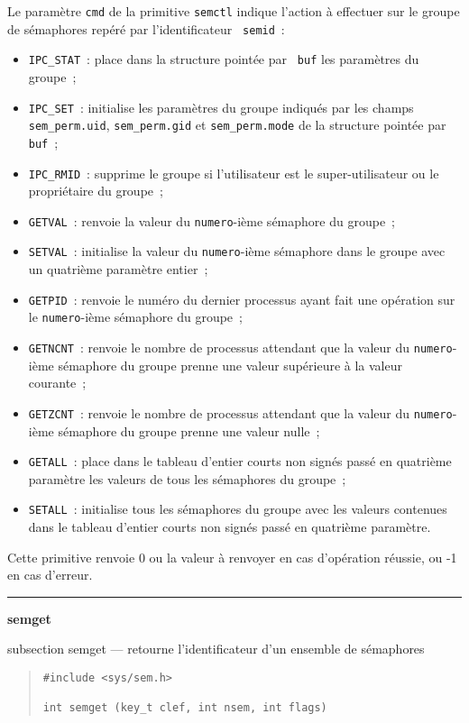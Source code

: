 \documentclass [twoside] {report}
\newcommand {\primitive} [1]
    {
	\phantomsection
	{\large \bf #1}
	\addcontentsline {toc} {subsection} {#1}
    }
\newcommand {\separation}
    {
	\vspace {5mm}
	\nopagebreak
	\hrule
    }
\begin{document}
Le paramètre {\tt cmd} de la primitive {\tt semctl} indique l'action à
effectuer sur le groupe de sémaphores repéré par l'identificateur {\tt
semid}~:

\begin {itemize}
    \item {\tt IPC\_STAT}~: place dans la structure pointée par {\tt
	buf} les paramètres du groupe~;
    \item {\tt IPC\_SET}~: initialise les paramètres du groupe
	indiqués par les champs {\tt sem\_perm.uid}, {\tt sem\_perm.gid}
	et {\tt sem\_perm.mode} de la structure pointée par {\tt buf}~;
    \item {\tt IPC\_RMID}~: supprime le groupe si l'utilisateur est le
	super-utilisateur ou le propriétaire du groupe~;
    \item {\tt GETVAL}~:  renvoie la valeur du {\tt numero}-ième
	sémaphore du groupe~;
    \item {\tt SETVAL}~: initialise la valeur du {\tt numero}-ième
	sémaphore dans le groupe avec un quatrième paramètre entier~;
    \item {\tt GETPID}~: renvoie le numéro du dernier processus ayant
	fait une opération sur le {\tt numero}-ième sémaphore du
	groupe~;
    \item {\tt GETNCNT}~: renvoie le nombre de processus attendant que
	la valeur du {\tt numero}-ième sémaphore du groupe prenne une
	valeur supérieure à la valeur courante~;
    \item {\tt GETZCNT}~: renvoie le nombre de processus attendant que
	la valeur du {\tt numero}-ième sémaphore du groupe prenne une
	valeur nulle~;
    \item {\tt GETALL}~: place dans le tableau d'entier courts non
	signés passé en quatrième paramètre les valeurs de tous les
	sémaphores du groupe~;
    \item {\tt SETALL}~: initialise tous les sémaphores du groupe avec
	les valeurs contenues dans le tableau d'entier courts non
	signés passé en quatrième paramètre.
\end {itemize}

Cette primitive renvoie 0 ou la valeur à renvoyer en cas d'opération
réussie, ou -1 en cas d'erreur.


\separation
\primitive {semget} --- retourne l'identificateur d'un ensemble de sémaphores

\begin {quote}
\begin {verbatim}
#include <sys/sem.h>

int semget (key_t clef, int nsem, int flags)
\end{verbatim}
\end {quote}
\end{document}
